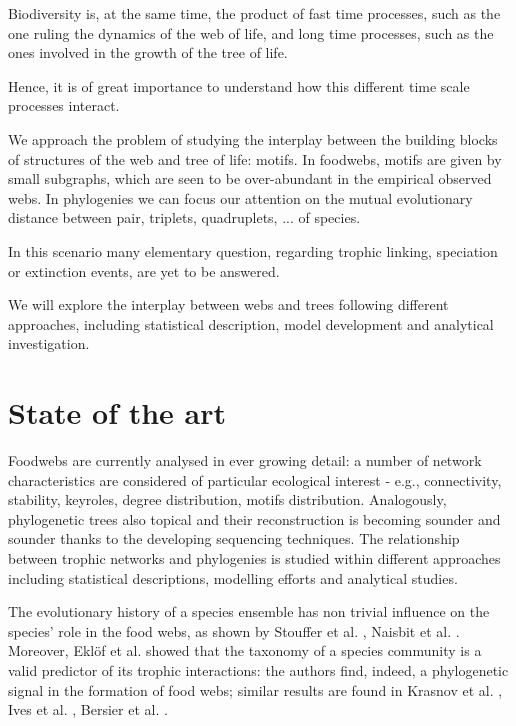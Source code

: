 \documentclass[12pt,a4paper]{report}
\begin{document}
Biodiversity is, at the same time, the product of fast time processes, such as the one ruling the dynamics of the web of life, and long time processes, such as the ones involved in the growth of the tree of life.

Hence, it is of great importance to understand how this different time scale processes interact.

We approach the problem of studying the interplay between the building blocks of structures of the web and tree of life: motifs. In foodwebs, motifs are given by small subgraphs, which are seen to be over-abundant in the empirical observed webs. In phylogenies we can focus our attention on the mutual evolutionary distance between pair, triplets, quadruplets, ... of species.

In this scenario many elementary question, regarding trophic linking, speciation or extinction events, are yet to be answered.

We will explore the interplay between webs and trees following different approaches, including statistical description, model development and analytical investigation.



\chapter{State of the art}
Foodwebs are currently analysed in ever growing detail: a number of network characteristics are considered of particular ecological interest - e.g., connectivity, stability, keyroles, degree distribution, motifs distribution. Analogously, phylogenetic trees also topical and their reconstruction is becoming sounder and sounder thanks to the developing sequencing techniques. The relationship between trophic networks and phylogenies is studied within different approaches including statistical descriptions, modelling efforts and analytical studies.

The evolutionary history of a species ensemble has non trivial influence on the species' role in the food webs, as shown by Stouffer et al. \cite{stouffer_evolutionary_2012}, Naisbit et al. \cite{naisbit_phylogeny_2012}. Moreover, Ekl\"{o}f et al. \cite{eklof_relevance_2012} showed that the taxonomy of a species community is a valid predictor of its trophic interactions: the authors find, indeed, a phylogenetic signal in the formation of food webs; similar results are found in Krasnov et al. \cite{krasnov_phylogenetic_2012}, Ives et al. \cite{ives_phylogenetic_2006}, Bersier et al. \cite{bersier_signature_2008}.
\end{document}
